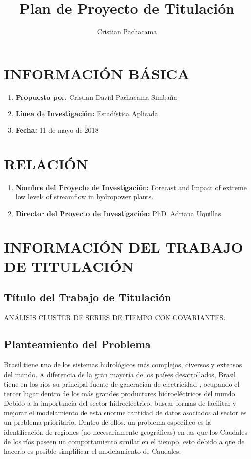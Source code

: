 \documentclass[10pt,a5paper]{article}
\author{Cristian Pachacama}
\title{Plan de Proyecto de Titulación}
\begin{document}
\maketitle
\section{INFORMACIÓN BÁSICA}


\begin{enumerate}

\item \textbf{Propuesto por:} Cristian David Pachacama Simbaña
\item \textbf{Línea de Investigación:} Estadística Aplicada
\item \textbf{Fecha:} 11 de mayo de 2018

\end{enumerate}

\section{RELACIÓN}

\begin{enumerate}

\item \textbf{Nombre del Proyecto de Investigación:} Forecast and Impact of extreme low levels of streamflow in hydropower plants.
\item \textbf{Director del Proyecto de Investigación:} PhD. Adriana Uquillas

\end{enumerate}


\section{INFORMACIÓN DEL TRABAJO DE TITULACIÓN}

\subsection{Título del Trabajo de Titulación}

ANÁLISIS CLUSTER DE SERIES DE TIEMPO CON COVARIANTES.

\subsection{Planteamiento del Problema}
Brasil tiene una de los sistemas hidrológicos más complejos, diversos y extensos del mundo. A diferencia de la gran mayoría de los países desarrollados, Brasil tiene en los ríos su principal fuente de generación de electricidad , ocupando el tercer lugar dentro de los más grandes productores hidroeléctricos del mundo. Debido a la importancia del sector hidroeléctrico, buscar formas de facilitar y mejorar el modelamiento de esta enorme cantidad de datos asociados al sector es un problema prioritario. Dentro de ellos, un problema específico es la identificación de regiones (no necesariamente geográficas) en las que los Caudales de los ríos poseen un comportamiento similar en el tiempo, esto debido a que de hacerlo es posible simplificar el modelamiento de Caudales.
\end{document}

